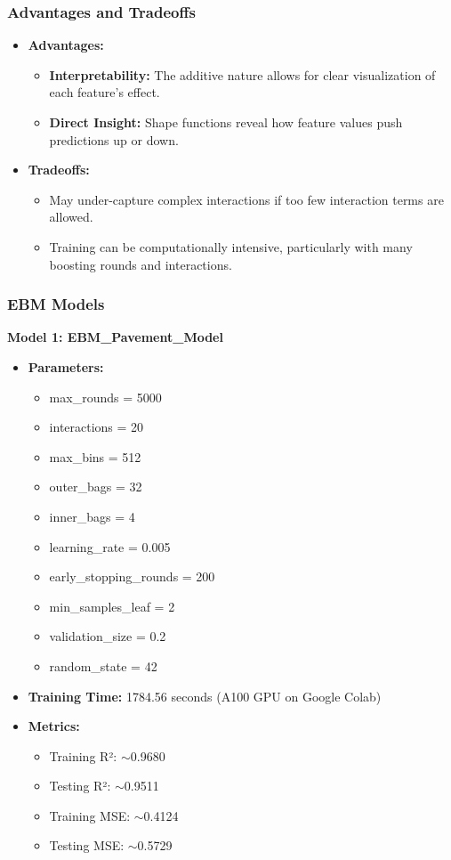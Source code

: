 \documentclass{article}
\begin{document}
\subsubsection*{Advantages and Tradeoffs}
\begin{itemize}
    \item \textbf{Advantages:}
        \begin{itemize}
            \item \textbf{Interpretability:} The additive nature allows for clear visualization of each feature's effect.
            \item \textbf{Direct Insight:} Shape functions reveal how feature values push predictions up or down.
        \end{itemize}
    \item \textbf{Tradeoffs:}
        \begin{itemize}
            \item May under-capture complex interactions if too few interaction terms are allowed.
            \item Training can be computationally intensive, particularly with many boosting rounds and interactions.
        \end{itemize}
\end{itemize}

\subsubsection*{EBM Models}

\textbf{Model 1: EBM\_Pavement\_Model}
\begin{itemize}
    \item \textbf{Parameters:}
    \begin{itemize}
        \item max\_rounds = 5000
        \item interactions = 20
        \item max\_bins = 512
        \item outer\_bags = 32
        \item inner\_bags = 4
        \item learning\_rate = 0.005
        \item early\_stopping\_rounds = 200
        \item min\_samples\_leaf = 2
        \item validation\_size = 0.2
        \item random\_state = 42
    \end{itemize}
    \item \textbf{Training Time:} 1784.56 seconds (A100 GPU on Google Colab)
    \item \textbf{Metrics:}
    \begin{itemize}
        \item Training R²: $\sim$0.9680
        \item Testing R²: $\sim$0.9511
        \item Training MSE: $\sim$0.4124
        \item Testing MSE: $\sim$0.5729
    \end{itemize}
\end{itemize}
\end{document}
